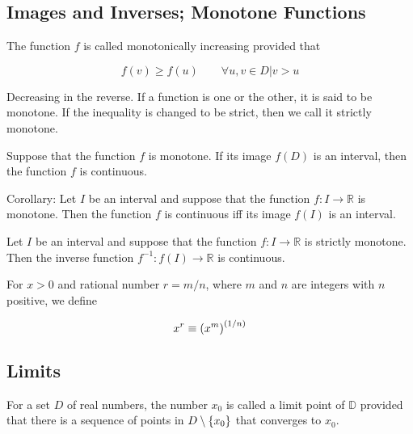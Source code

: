     \subsection{Images and Inverses; Monotone Functions}

    \begin{definition}
        The function $f$ is called monotonically increasing provided that

        \[ f(v) \ge f(u) \qquad \forall u, v \in D | v > u \]

        Decreasing in the reverse. If a function is one or the other, it is said to be monotone. If the inequality is
        changed to be strict, then we call it strictly monotone.
    \end{definition}

    \begin{thm}
        Suppose that the function $f$ is monotone. If its image $f(D)$ is an interval, then the function $f$ is
        continuous.

        Corollary: Let $I$ be an interval and suppose that the function $f:I\to\mathbb{R}$ is monotone. Then the function
        $f$ is continuous iff its image $f(I)$ is an interval.
    \end{thm}

    \begin{thm}
        Let $I$ be an interval and suppose that the function $f:I\to\mathbb{R}$ is strictly monotone. Then the inverse
        function $f^{-1}:f(I)\to\mathbb{R}$ is continuous.
    \end{thm}

    \begin{definition}
        For $x>0$ and rational number $r = m/n$, where $m$ and $n$ are integers with $n$ positive, we define

        \[ x^r \equiv {\left( x^m \right)}^{\left( 1/n \right)} \]
    \end{definition}

    \subsection{Limits}

    \begin{definition}
        For a set $D$ of real numbers, the number $x_0$ is called a limit point of $\mathbb{D}$ provided that there is a
        sequence of points in $D \setminus {\left\{ x_0 \right\}}$ that converges to $x_0$.
    \end{definition}

